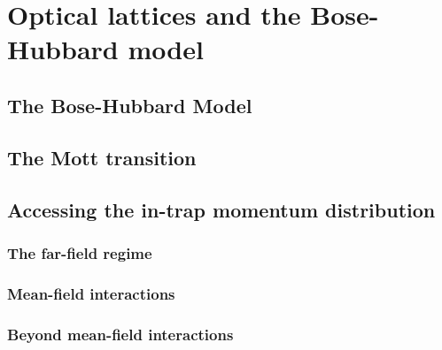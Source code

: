 \chapter{Optical lattices and the Bose-Hubbard model}

\label{sec:chapter_2}

\section{The Bose-Hubbard Model}

\section{The Mott transition}

\section{Accessing the in-trap momentum distribution}

\subsection{The far-field regime}

\subsection{Mean-field interactions}

\subsection{Beyond mean-field interactions}


